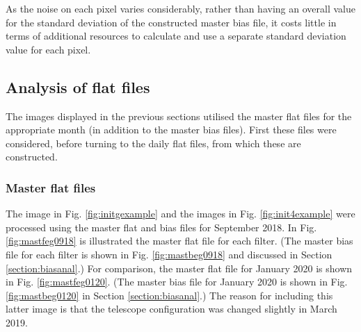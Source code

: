 As the noise on each pixel varies considerably, rather than having an overall
value for the standard deviation of the constructed master bias file, it costs
little in terms of additional resources to calculate and use a separate standard
deviation value for each pixel.

\clearpage

\subsection{Analysis of flat files}
\protect\label{section:flatanal}

The images displayed in the previous sections utilised the master flat files for
the appropriate month (in addition to the master bias files). First these files
were considered, before turning to the daily flat files, from which these are
constructed.

\subsubsection{Master flat files}
\protect\label{section:mastflats}

The image in Fig. \ref{fig:initgexample} and the images in Fig.
\ref{fig:init4example} were processed using the master flat and bias files for
September 2018. In Fig. \ref{fig:mastfeg0918} is illustrated the master flat
file for each filter. (The master bias file for each filter is shown in Fig.
\ref{fig:mastbeg0918} and discussed in Section \ref{section:biasanal}.) For
comparison, the master flat file for January 2020 is shown in Fig.
\ref{fig:mastfeg0120}. (The master bias file for January 2020 is shown in Fig.
\ref{fig:mastbeg0120} in Section \ref{section:biasanal}.) The reason for
including this latter image is that the telescope configuration was changed
slightly in March 2019.

